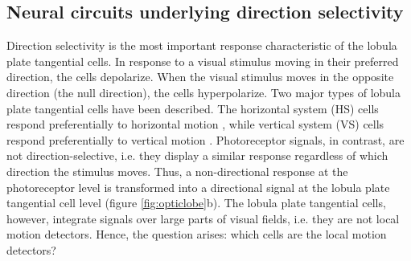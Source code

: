 \subsection{Neural circuits underlying direction selectivity}
Direction selectivity is the most important response characteristic of the lobula plate tangential cells. In response to a visual stimulus moving in their preferred direction, the cells depolarize. When the visual stimulus moves in the opposite direction (the null direction), the cells hyperpolarize. Two major types of lobula plate tangential cells have been described. The horizontal system (HS) cells respond preferentially to horizontal motion \parencite{Schnell2010}, while vertical system (VS) cells respond preferentially to vertical motion \parencite{Joesch2008}. Photoreceptor signals, in contrast, are not direction-selective, i.e. they display a similar response regardless of which direction the stimulus moves. Thus, a non-directional response at the photoreceptor level is transformed into a directional signal at the lobula plate tangential cell level (figure \ref{fig:opticlobe}b). The lobula plate tangential cells, however, integrate signals over large parts of visual fields, i.e. they are not local motion detectors. Hence, the question arises: which cells are the local motion detectors? 



